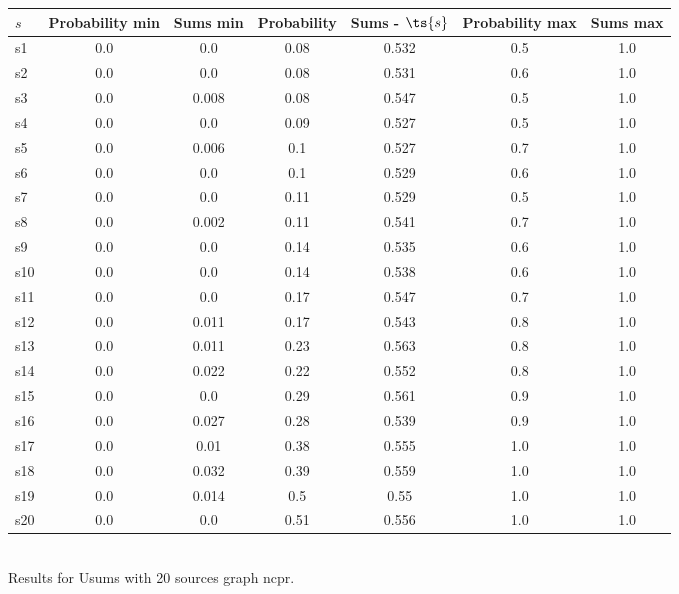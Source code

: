 \documentclass{article}
\begin{document}
\noindent\begin{tabular}{|l|c|c|c|c|c|c|}
\hline
$s$& Probability min & Sums min & Probability & Sums - $\ts{s}$ & Probability max & Sums max\\
\hline
s1 &0.0 & 0.0 & 0.08 & 0.532 & 0.5 & 1.0\\
\hline
s2 &0.0 & 0.0 & 0.08 & 0.531 & 0.6 & 1.0\\
\hline
s3 &0.0 & 0.008 & 0.08 & 0.547 & 0.5 & 1.0\\
\hline
s4 &0.0 & 0.0 & 0.09 & 0.527 & 0.5 & 1.0\\
\hline
s5 &0.0 & 0.006 & 0.1 & 0.527 & 0.7 & 1.0\\
\hline
s6 &0.0 & 0.0 & 0.1 & 0.529 & 0.6 & 1.0\\
\hline
s7 &0.0 & 0.0 & 0.11 & 0.529 & 0.5 & 1.0\\
\hline
s8 &0.0 & 0.002 & 0.11 & 0.541 & 0.7 & 1.0\\
\hline
s9 &0.0 & 0.0 & 0.14 & 0.535 & 0.6 & 1.0\\
\hline
s10 &0.0 & 0.0 & 0.14 & 0.538 & 0.6 & 1.0\\
\hline
s11 &0.0 & 0.0 & 0.17 & 0.547 & 0.7 & 1.0\\
\hline
s12 &0.0 & 0.011 & 0.17 & 0.543 & 0.8 & 1.0\\
\hline
s13 &0.0 & 0.011 & 0.23 & 0.563 & 0.8 & 1.0\\
\hline
s14 &0.0 & 0.022 & 0.22 & 0.552 & 0.8 & 1.0\\
\hline
s15 &0.0 & 0.0 & 0.29 & 0.561 & 0.9 & 1.0\\
\hline
s16 &0.0 & 0.027 & 0.28 & 0.539 & 0.9 & 1.0\\
\hline
s17 &0.0 & 0.01 & 0.38 & 0.555 & 1.0 & 1.0\\
\hline
s18 &0.0 & 0.032 & 0.39 & 0.559 & 1.0 & 1.0\\
\hline
s19 &0.0 & 0.014 & 0.5 & 0.55 & 1.0 & 1.0\\
\hline
s20 &0.0 & 0.0 & 0.51 & 0.556 & 1.0 & 1.0\\
\hline
\end{tabular}\\

\noindent Results for Usums with 20 sources graph ncpr.
\end{document}
